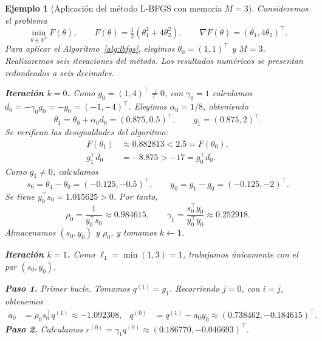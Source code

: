\documentclass[a4paper,openany,oneside,10pt]{report}
\theoremstyle{pnlTeorema}
\theoremstyle{pnlDefinicion}
\theoremstyle{pnlObservacion}
\newtheorem{ejemplo}{Ejemplo}[section]
\begin{document}
\begin{ejemplo}[Aplicación del método L-BFGS con memoria $M=3$]\label{ej:lbfgs-memoria-tres}
Consideremos el problema
\[
    \min_{\theta\in\mathbb{R}^2}F(\theta),\qquad
    F(\theta)=\tfrac12(\theta_1^2+4\theta_2^2),\qquad
    \nabla F(\theta)=(\theta_1,4\theta_2)^\top.
\]
Para aplicar el Algoritmo~\ref{alg:lbfgs}, elegimos $\theta_0=(1,1)^\top$ y $M=3$.
Realizaremos seis iteraciones del método. Los resultados numéricos se presentan redondeados a seis decimales.

\smallskip
\noindent\textbf{Iteración $k=0$.} Como $g_0=(1,4)^\top\ne0$, con $\gamma_0=1$ calculamos $d_0=-\gamma_0g_0=-g_0=(-1,-4)^\top$. Elegimos $\alpha_0=1/8$, obteniendo
\[
    \theta_1=\theta_0+\alpha_0d_0=(0.875,0.5)^\top,\qquad g_1=(0.875,2)^\top.
\]
Se verifican las desigualdades del algoritmo:
\[
\begin{aligned}
    F(\theta_1)&\approx0.882813<2.5=F(\theta_0),\\
    g_1^\top d_0&=-8.875>-17=g_0^\top d_0.
\end{aligned}
\]
Como $g_1\ne0$, calculamos
\[
    s_0=\theta_1-\theta_0=(-0.125,-0.5)^\top,\qquad
    y_0=g_1-g_0=(-0.125,-2)^\top.
\]
Se tiene $y_0^\top s_0=1.015625>0$. Por tanto,
\[
    \rho_0=\frac{1}{y_0^\top s_0}\approx0.984615,\qquad
    \gamma_1=\frac{s_0^\top y_0}{y_0^\top y_0}\approx0.252918.
\]
Almacenamos $(s_0,y_0)$ y $\rho_0$, y tomamos $k\leftarrow1$.

\smallskip
\noindent\textbf{Iteración $k=1$.} Como $\ell_1=\min(1,3)=1$, trabajamos únicamente con el par $(s_0,y_0)$.

\noindent\textbf{Paso 1.} Primer bucle. Tomamos $q^{(1)}=g_1$. Recorriendo $j=0$, con $i=j$, obtenemos
\[
\begin{aligned}
    a_0&=\rho_0s_0^\top q^{(1)}\approx -1.092308, & q^{(0)}&=q^{(1)}-a_0y_0\approx (0.738462,-0.184615)^\top.
\end{aligned}
\]
\noindent\textbf{Paso 2.} Calculamos $r^{(0)}=\gamma_1q^{(0)}\approx (0.186770,-0.046693)^\top$.


\end{ejemplo}
\end{document}
